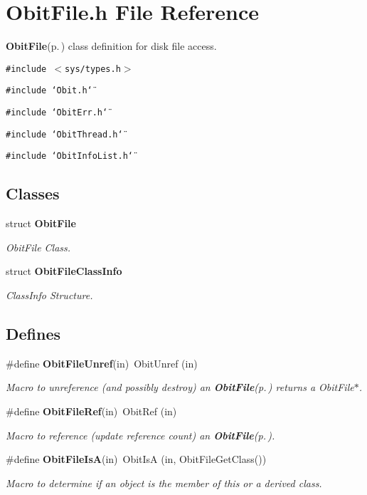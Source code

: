 \section{Obit\-File.h File Reference}
\label{ObitFile_8h}
{\bf Obit\-File}{\rm (p.\,\pageref{structObitFile})} class definition for disk file access. 

{\tt \#include $<$sys/types.h$>$}\par
{\tt \#include \char`\"{}Obit.h\char`\"{}}\par
{\tt \#include \char`\"{}Obit\-Err.h\char`\"{}}\par
{\tt \#include \char`\"{}Obit\-Thread.h\char`\"{}}\par
{\tt \#include \char`\"{}Obit\-Info\-List.h\char`\"{}}\par
\subsection*{Classes}
\begin{CompactItemize}
\item 
struct {\bf Obit\-File}
\begin{CompactList}\small\item\em Obit\-File Class. \item\end{CompactList}\item 
struct {\bf Obit\-File\-Class\-Info}
\begin{CompactList}\small\item\em Class\-Info Structure. \item\end{CompactList}\end{CompactItemize}
\subsection*{Defines}
\begin{CompactItemize}
\item 
\#define {\bf Obit\-File\-Unref}(in)\ Obit\-Unref (in)
\begin{CompactList}\small\item\em Macro to unreference (and possibly destroy) an {\bf Obit\-File}{\rm (p.\,\pageref{structObitFile})} returns a Obit\-File$\ast$. \item\end{CompactList}\item 
\#define {\bf Obit\-File\-Ref}(in)\ Obit\-Ref (in)
\begin{CompactList}\small\item\em Macro to reference (update reference count) an {\bf Obit\-File}{\rm (p.\,\pageref{structObitFile})}. \item\end{CompactList}\item 
\#define {\bf Obit\-File\-Is\-A}(in)\ Obit\-Is\-A (in, Obit\-File\-Get\-Class())
\begin{CompactList}\small\item\em Macro to determine if an object is the member of this or a derived class. \item\end{CompactList}\end{CompactItemize}

